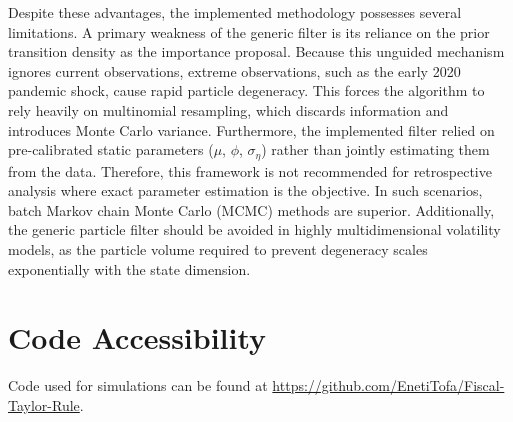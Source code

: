 \documentclass[10pt, a4paper]{article}
\numberwithin{equation}{section}
\begin{document}
Despite these advantages, the implemented methodology possesses several limitations. A primary weakness of the generic filter is its reliance on the prior transition density as the importance proposal. Because this unguided mechanism ignores current observations, extreme observations, such as the early 2020 pandemic shock, cause rapid particle degeneracy. This forces the algorithm to rely heavily on multinomial resampling, which discards information and introduces Monte Carlo variance. Furthermore, the implemented filter relied on pre-calibrated static parameters (\(\mu\), \(\phi\), \(\sigma_\eta\)) rather than jointly estimating them from the data. Therefore, this framework is not recommended for retrospective analysis where exact parameter estimation is the objective. In such scenarios, batch Markov chain Monte Carlo (MCMC) methods are superior. Additionally, the generic particle filter should be avoided in highly multidimensional volatility models, as the particle volume required to prevent degeneracy scales exponentially with the state dimension.

\newpage
\singlespacing{}

\section*{Code Accessibility}
Code used for simulations can be found at \url{https://github.com/EnetiTofa/Fiscal-Taylor-Rule}.

\printbibliography{}
\end{document}
